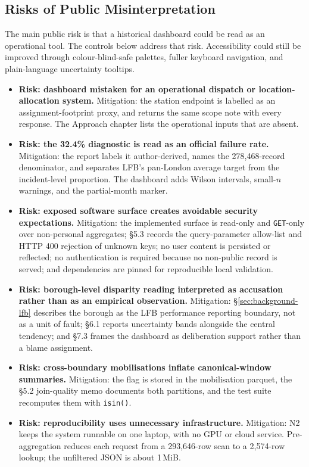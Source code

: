 \subsection{Risks of Public Misinterpretation}

The main public risk is that a historical dashboard could be read as an operational tool. The controls below address that risk. Accessibility could still be improved through colour-blind-safe palettes, fuller keyboard navigation, and plain-language uncertainty tooltips.

\begin{itemize}
    \item \textbf{Risk: dashboard mistaken for an operational dispatch or location-allocation system.} Mitigation: the station endpoint is labelled as an assignment-footprint proxy, and  returns the same scope note with every response. The Approach chapter lists the operational inputs that are absent.
    \item \textbf{Risk: the 32.4\% diagnostic is read as an official failure rate.} Mitigation: the report labels it author-derived, names the 278{,}468-record denominator, and separates LFB's pan-London average target from the incident-level proportion. The dashboard adds Wilson intervals, small-$n$ warnings, and the partial-month marker.
    \item \textbf{Risk: exposed software surface creates avoidable security expectations.} Mitigation: the implemented surface is read-only and \texttt{GET}-only over non-personal aggregates; \S5.3 records the query-parameter allow-list and HTTP 400 rejection of unknown keys; no user content is persisted or reflected; no authentication is required because no non-public record is served; and dependencies are pinned for reproducible local validation.
    \item \textbf{Risk: borough-level disparity reading interpreted as accusation rather than as an empirical observation.} Mitigation: \S\ref{sec:background-lfb} describes the borough as the LFB performance reporting boundary, not as a unit of fault; §6.1 reports uncertainty bands alongside the central tendency; and §7.3 frames the dashboard as deliberation support rather than a blame assignment.
    \item \textbf{Risk: cross-boundary mobilisations inflate canonical-window summaries.} Mitigation: the  flag is stored in the mobilisation parquet, the §5.2 join-quality memo documents both partitions, and the test suite recomputes them with \texttt{isin()}.
    \item \textbf{Risk: reproducibility uses unnecessary infrastructure.} Mitigation: N2 keeps the system runnable on one laptop, with no GPU or cloud service. Pre-aggregation reduces each request from a 293{,}646-row scan to a 2{,}574-row lookup; the unfiltered JSON is about 1\,MiB.
\end{itemize}

